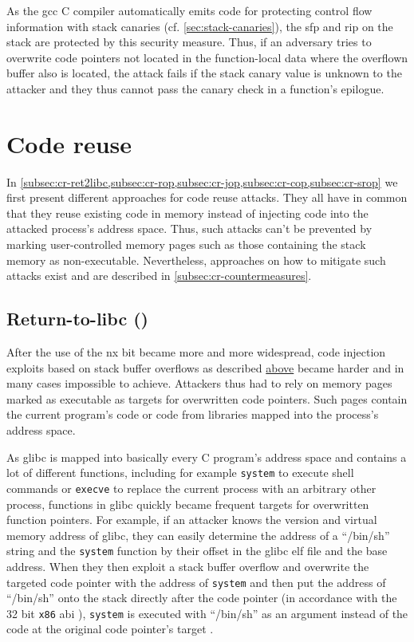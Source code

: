 As the \gls{gcc} C compiler automatically emits code for protecting control flow information with stack canaries (cf. \cref{sec:stack-canaries}), the \gls{sfp} and \gls{rip} on the stack are protected by this security measure.
Thus, if an adversary tries to overwrite code pointers not located in the function-local data where the overflown buffer also is located, the attack fails if the stack canary value is unknown to the attacker and they thus cannot pass the canary check in a function's epilogue.

\section{Code reuse}
\label{sec:code-reuse}

In \cref{subsec:cr-ret2libc,subsec:cr-rop,subsec:cr-jop,subsec:cr-cop,subsec:cr-srop} we first present different approaches for code reuse attacks.
They all have in common that they reuse existing code in memory instead of injecting code into the attacked process's address space.
Thus, such attacks can't be prevented by marking user-controlled memory pages such as those containing the stack memory as non-executable.
Nevertheless, approaches on how to mitigate such attacks exist and are described in \cref{subsec:cr-countermeasures}.

\subsection{Return-to-libc ()}
\label{subsec:cr-ret2libc}

After the use of the \gls{nx} bit became more and more widespread, code injection exploits based on stack buffer overflows as described \hyperref[sec:code-injection]{above} became harder and in many cases impossible to achieve.
Attackers thus had to rely on memory pages marked as executable as targets for overwritten code pointers.
Such pages contain the current program's code or code from libraries mapped into the process's address space.

As \gls{glibc} is mapped into basically every C program's address space and contains a lot of different functions, including for example \texttt{system} to execute shell commands or \texttt{execve} to replace the current process with an arbitrary other process, functions in \gls{glibc} quickly became frequent targets for overwritten function pointers.
For example, if an attacker knows the version and virtual memory address of \gls{glibc}, they can easily determine the address of a ``/bin/sh'' string and the \texttt{system} function by their offset in the \gls{glibc} \gls{elf} file and the base address.
When they then exploit a stack buffer overflow and overwrite the targeted code pointer with the address of \texttt{system} and then put the address of ``/bin/sh'' onto the stack directly after the code pointer (in accordance with the 32 bit \texttt{x86} \gls{abi} \cites[11\psq]{Lu2015}[17\psqq]{Fog2019}), \texttt{system} is executed with ``/bin/sh'' as an argument instead of the code at the original code pointer's target \cite{SolarDesigner1997}.

